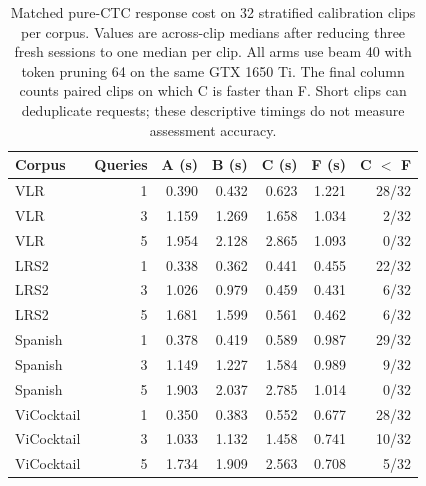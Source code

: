 \begin{table}[tb]
\centering\small
\caption{Matched pure-CTC response cost on 32 stratified calibration clips per corpus. Values are across-clip medians after reducing three fresh sessions to one median per clip. All arms use beam 40 with token pruning 64 on the same GTX 1650 Ti. The final column counts paired clips on which C is faster than F. Short clips can deduplicate requests; these descriptive timings do not measure assessment accuracy.}
\label{tab:matched-query-cost}
\begin{tabular}{lrrrrrr}
\toprule
Corpus & Queries & A (s) & B (s) & C (s) & F (s) & C $<$ F \\
\midrule
VLR & 1 & 0.390 & 0.432 & 0.623 & 1.221 & 28/32 \\
VLR & 3 & 1.159 & 1.269 & 1.658 & 1.034 & 2/32 \\
VLR & 5 & 1.954 & 2.128 & 2.865 & 1.093 & 0/32 \\
LRS2 & 1 & 0.338 & 0.362 & 0.441 & 0.455 & 22/32 \\
LRS2 & 3 & 1.026 & 0.979 & 0.459 & 0.431 & 6/32 \\
LRS2 & 5 & 1.681 & 1.599 & 0.561 & 0.462 & 6/32 \\
Spanish & 1 & 0.378 & 0.419 & 0.589 & 0.987 & 29/32 \\
Spanish & 3 & 1.149 & 1.227 & 1.584 & 0.989 & 9/32 \\
Spanish & 5 & 1.903 & 2.037 & 2.785 & 1.014 & 0/32 \\
ViCocktail & 1 & 0.350 & 0.383 & 0.552 & 0.677 & 28/32 \\
ViCocktail & 3 & 1.033 & 1.132 & 1.458 & 0.741 & 10/32 \\
ViCocktail & 5 & 1.734 & 1.909 & 2.563 & 0.708 & 5/32 \\
\bottomrule
\end{tabular}
\end{table}
